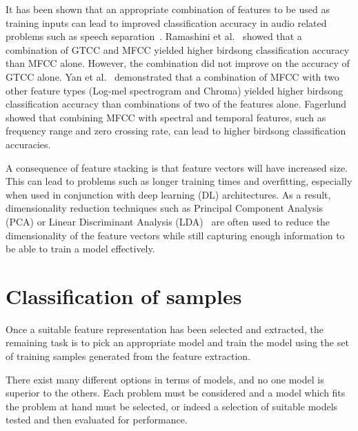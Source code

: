 It has been shown that an appropriate combination of features to be used as
training inputs can lead to improved classification accuracy in audio related
problems such as speech separation~\cite{wang2012exploring}. Ramashini et
al.~\cite{ramashini2022robust} showed that a combination of GTCC and MFCC yielded
higher birdsong classification accuracy than MFCC alone. However, the
combination did not improve on the accuracy of GTCC alone. Yan et
al.~\cite{yan2021birdsong} demonstrated that a combination of MFCC with two other
feature types (Log-mel spectrogram and Chroma) yielded higher birdsong
classification accuracy than combinations of two of the features alone.
Fagerlund~\cite{fagerlund2007bird} showed that combining MFCC with spectral and
temporal features, such as frequency range and zero crossing rate, can lead to
higher birdsong classification accuracies.

A consequence of feature stacking is that feature vectors will have increased
size. This can lead to problems such as longer training times and overfitting,
especially when used in conjunction with deep learning (DL) architectures. As a
result, dimensionality reduction techniques such as Principal Component
Analysis (PCA) or Linear Discriminant Analysis (LDA)~\cite{ramashini2019bird}
are often used to reduce the dimensionality of the feature vectors while still
capturing enough information to be able to train a model effectively.

\section{Classification of samples}\label{sec:classification}

Once a suitable feature representation has been selected and extracted, the
remaining task is to pick an appropriate model and train the model using the set
of training samples generated from the feature extraction.

There exist many different options in terms of models, and no one model is
superior to the others. Each problem must be considered and a model which fits
the problem at hand must be selected, or indeed a selection of suitable models
tested and then evaluated for performance.

